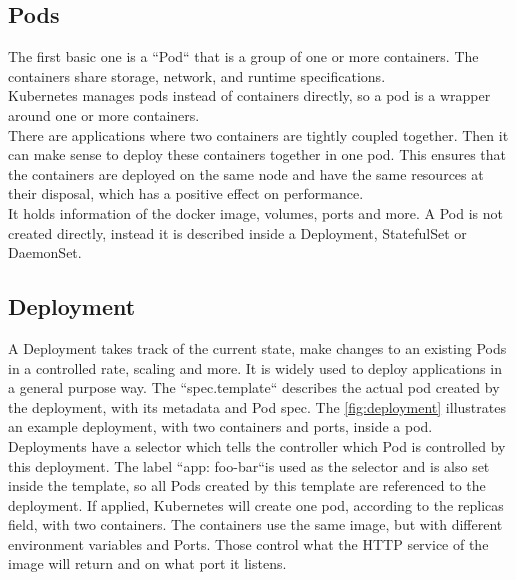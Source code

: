 \subsection{Pods}
The first basic one is a ``Pod`` that is a group of one or more containers.
The containers share storage, network, and runtime specifications.
\\
Kubernetes manages pods instead of containers directly, so a pod is a wrapper around one or more containers.
\\
There are applications where two containers are tightly coupled together.
Then it can make sense to deploy these containers together in one pod.
This ensures that the containers are deployed on the same node and have the same resources at their disposal, which has a positive effect on performance.
\\
It holds information of the docker image, volumes, ports and more.
A Pod is not created directly, instead it is described inside a Deployment, StatefulSet or DaemonSet.

\subsection{Deployment}

A Deployment takes track of the current state, make changes to an existing Pods in a controlled rate, scaling and more.
It is widely used to deploy applications in a general purpose way.
The ``spec.template`` describes the actual pod created by the deployment, with its metadata and Pod spec.
The \autoref{fig:deployment} illustrates an example deployment, with two containers and ports, inside a pod.
Deployments have a selector which tells the controller which Pod is controlled by this deployment.
The label ``app: foo-bar``is used as the selector and is also set inside the template, so all Pods created by this template are referenced to the deployment.
If applied, Kubernetes will create one pod, according to the replicas field, with two containers.
The containers use the same image, but with different environment variables and Ports.
Those control what the HTTP service of the image will return and on what port it listens.


